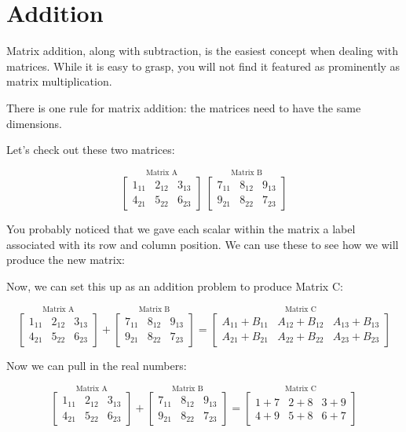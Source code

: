 \documentclass[
  letterpaper,
]{krantz}
\begin{document}
\section{Addition}\label{addition}

Matrix addition, along with subtraction, is the easiest concept when
dealing with matrices. While it is easy to grasp, you will not find it
featured as prominently as matrix multiplication.

There is one rule for matrix addition: the matrices need to have the
same dimensions.

Let's check out these two matrices:

\[
\stackrel{\mbox{Matrix A}}{
\begin{bmatrix}
1_{11} & 2_{12} & 3_{13}\\
4_{21} & 5_{22} & 6_{23}
\end{bmatrix}
}  
\ 
\stackrel{\mbox{Matrix B}}{
\begin{bmatrix}
7_{11} & 8_{12} & 9_{13}\\
9_{21} & 8_{22} & 7_{23}
\end{bmatrix} 
}
\]

You probably noticed that we gave each scalar within the matrix a label
associated with its row and column position. We can use these to see how
we will produce the new matrix:

Now, we can set this up as an addition problem to produce Matrix C:

\[
\stackrel{\mbox{Matrix A}}{
\begin{bmatrix}
1_{11} & 2_{12} & 3_{13}\\
4_{21} & 5_{22} & 6_{23}
\end{bmatrix}
}  
+ 
\stackrel{\mbox{Matrix B}}{
\begin{bmatrix}
7_{11} & 8_{12} & 9_{13}\\
9_{21} & 8_{22} & 7_{23}
\end{bmatrix} 
}
=
\stackrel{\mbox{Matrix C}}{
\begin{bmatrix}
A_{11} + B_{11}& A_{12} + B_{12} & A_{13} + B_{13}\\
A_{21} + B_{21}& A_{22} + B_{22} & A_{23} + B_{23}
\end{bmatrix}
}
\]

Now we can pull in the real numbers:

\[
\stackrel{\mbox{Matrix A}}{
\begin{bmatrix}
1_{11} & 2_{12} & 3_{13}\\
4_{21} & 5_{22} & 6_{23}
\end{bmatrix}
}  
+ 
\stackrel{\mbox{Matrix B}}{
\begin{bmatrix}
7_{11} & 8_{12} & 9_{13}\\
9_{21} & 8_{22} & 7_{23}
\end{bmatrix} 
}
=
\stackrel{\mbox{Matrix C}}{
\begin{bmatrix}
1 + 7  & 2 + 8 & 3 + 9\\
4 + 9 & 5 + 8 & 6 + 7
\end{bmatrix}
}
\]
\end{document}
